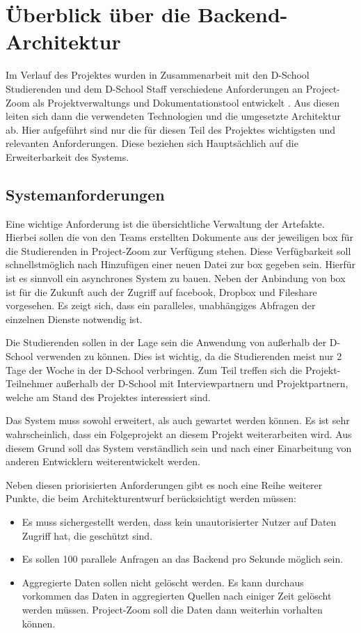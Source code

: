 \chapter{Überblick über die Backend-Architektur}
Im Verlauf des Projektes wurden in Zusammenarbeit mit den D-School Studierenden und dem D-School Staff verschiedene Anforderungen an Project-Zoom als Projektverwaltungs und Dokumentationstool entwickelt \cite{requirements}.  Aus diesen leiten sich dann die verwendeten Technologien und die umgesetzte Architektur ab. Hier aufgeführt sind nur die für diesen Teil des Projektes wichtigsten und relevanten Anforderungen. Diese beziehen sich Hauptsächlich auf die Erweiterbarkeit des Systems.

\section{Systemanforderungen}
Eine wichtige Anforderung ist die übersichtliche Verwaltung der Artefakte. Hierbei sollen die von den Teams erstellten Dokumente aus der jeweiligen \gls{box} für die Studierenden in Project-Zoom zur Verfügung stehen. Diese Verfügbarkeit soll schnellstmöglich nach Hinzufügen einer neuen Datei zur \gls{box} gegeben sein. Hierfür ist es sinnvoll ein asynchrones System zu bauen.  Neben der Anbindung von \gls{box} ist für die Zukunft auch der Zugriff auf facebook, Dropbox und Fileshare vorgesehen. Es zeigt sich, dass ein paralleles, unabhängiges Abfragen der einzelnen Dienste notwendig ist.

Die Studierenden sollen in der Lage sein die Anwendung von außerhalb der D-School verwenden zu können. Dies ist wichtig, da die Studierenden meist nur 2 Tage der Woche in der D-School verbringen. Zum Teil treffen sich die Projekt-Teilnehmer außerhalb der D-School mit Interviewpartnern und Projektpartnern, welche am Stand des Projektes interessiert sind. 

Das System muss sowohl erweitert, als auch gewartet werden können. Es ist sehr wahrscheinlich, dass ein Folgeprojekt an diesem Projekt weiterarbeiten wird. Aus diesem Grund soll das System verständlich sein und nach einer Einarbeitung von anderen Entwicklern weiterentwickelt werden. 

Neben diesen priorisierten Anforderungen gibt es noch eine Reihe weiterer Punkte, die beim Architekturentwurf berücksichtigt werden müssen:
 
\begin{itemize}
 \item Es muss sichergestellt werden, dass kein unautorisierter Nutzer auf Daten Zugriff hat, die geschützt sind.
 \item Es sollen 100 parallele Anfragen an das Backend pro Sekunde möglich sein.
  \item Aggregierte Daten sollen nicht gelöscht werden. Es kann durchaus vorkommen das Daten in aggregierten Quellen nach einiger Zeit gelöscht werden müssen. Project-Zoom soll die Daten dann weiterhin vorhalten können.
\end{itemize} 

